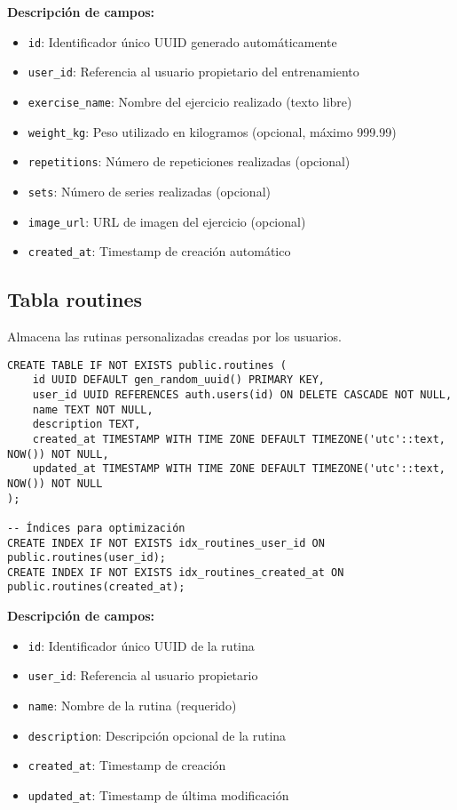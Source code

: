 \documentclass[12pt,a4paper]{article}
\begin{document}
\textbf{Descripción de campos:}
\begin{itemize}
    \item \texttt{id}: Identificador único UUID generado automáticamente
    \item \texttt{user\_id}: Referencia al usuario propietario del entrenamiento
    \item \texttt{exercise\_name}: Nombre del ejercicio realizado (texto libre)
    \item \texttt{weight\_kg}: Peso utilizado en kilogramos (opcional, máximo 999.99)
    \item \texttt{repetitions}: Número de repeticiones realizadas (opcional)
    \item \texttt{sets}: Número de series realizadas (opcional)
    \item \texttt{image\_url}: URL de imagen del ejercicio (opcional)
    \item \texttt{created\_at}: Timestamp de creación automático
\end{itemize}

\subsection{Tabla routines}

Almacena las rutinas personalizadas creadas por los usuarios.

\begin{lstlisting}[style=sqlstyle, caption=Estructura completa de routines]
CREATE TABLE IF NOT EXISTS public.routines (
    id UUID DEFAULT gen_random_uuid() PRIMARY KEY,
    user_id UUID REFERENCES auth.users(id) ON DELETE CASCADE NOT NULL,
    name TEXT NOT NULL,
    description TEXT,
    created_at TIMESTAMP WITH TIME ZONE DEFAULT TIMEZONE('utc'::text, NOW()) NOT NULL,
    updated_at TIMESTAMP WITH TIME ZONE DEFAULT TIMEZONE('utc'::text, NOW()) NOT NULL
);

-- Índices para optimización
CREATE INDEX IF NOT EXISTS idx_routines_user_id ON public.routines(user_id);
CREATE INDEX IF NOT EXISTS idx_routines_created_at ON public.routines(created_at);
\end{lstlisting}

\textbf{Descripción de campos:}
\begin{itemize}
    \item \texttt{id}: Identificador único UUID de la rutina
    \item \texttt{user\_id}: Referencia al usuario propietario
    \item \texttt{name}: Nombre de la rutina (requerido)
    \item \texttt{description}: Descripción opcional de la rutina
    \item \texttt{created\_at}: Timestamp de creación
    \item \texttt{updated\_at}: Timestamp de última modificación
\end{itemize}
\end{document}
